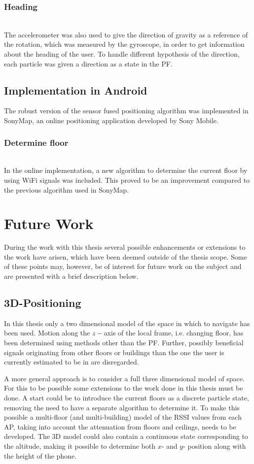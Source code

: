 \documentclass{LTHthesis}
\begin{document}
\subsubsection{Heading} ~\\
The accelerometer was also used to give the direction of gravity as a reference of the rotation, which was measured by the gyroscope, in order to get information about the heading of the user. To handle different hypothesis of the direction, each particle was given a direction as a state in the PF.

\subsection{Implementation in Android}
The robust version of the sensor fused positioning algorithm was implemented in SonyMap, an online positioning application developed by Sony Mobile.

\subsubsection{Determine floor} ~\\
In the online implementation, a new algorithm to determine the current floor by using WiFi signals was included. This proved to be an improvement compared to the previous algorithm used in SonyMap.

\section{Future Work}
%
During the work with this thesis several possible enhancements or extensions to the work have arisen, which have been deemed outside of the thesis scope. Some of these points may, however, be of interest for future work on the subject and are presented with a brief description below. 
%
\subsection{3D-Positioning}
%
In this thesis only a two dimensional model of the space in which to navigate has been used. Motion along the $z-$axis of the local frame, i.e. changing floor, has been determined using methods other than the PF. Further, possibly beneficial signals originating from other floors or buildings than the one the user is currently estimated to be in are disregarded.

A more general approach is to consider a full three dimensional model of space. For this to be possible some extensions to the work done in this thesis must be done. A start could be to introduce the current floors as a discrete particle state, removing the need to have a separate algorithm to determine it. To make this possible a multi-floor (and multi-building) model of the RSSI values from each AP, taking into account the attenuation from floors and ceilings, needs to be developed. The 3D model could also contain a continuous state corresponding to the altitude, making it possible to determine both $x$- and $y$- position along with the height of the phone. 
%
\end{document}
